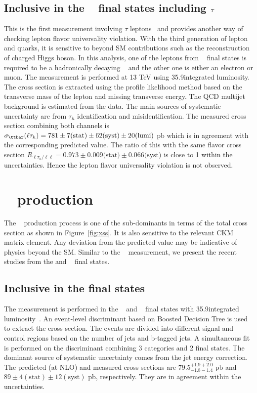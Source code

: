 \subsection{Inclusive in the \dilep~ final states including ${\tau}$}
This is the first measurement involving $\tau$ leptons~\cite{CMS:2019snc} and provides another 
way of checking lepton flavor universality violation. With the third generation of lepton and quarks,
it is sensitive to beyond SM contributions such as the reconstruction of charged Higgs boson. In 
this analysis, one of the leptons from \dilep~ final states is required to be a hadronically 
decaying \PQtau~ and the other one is either an electron or muon. The measurement is performed at 
13 TeV using 35.9\fbinv integrated luminosity. The cross section is extracted using the profile 
likelihood method based on the transverse mass of the lepton and missing transverse energy. The  
QCD multijet background is estimated from the data. The main sources of systematic uncertainty are 
from $\tau_h$ identification and misidentification. The measured cross section combining both 
channels is  
$\sigma_\ttbar(\ell\tau_h) = 781 \pm 7 \text{(stat)} \pm 62 \text{(syst)} \pm 20 \text{(lumi)}$ pb
which is in agreement with the corresponding predicted value. The ratio of this with the same 
flavor cross section 
$R_{\ell\tau_h/\ell\ell} = 0.973 \pm 0.009 \text{(stat)} \pm 0.066 \text{(syst)}$ is close to 1 
within the uncertainties. Hence the lepton flavor universality violation is not observed.

\section{\PQt\PW~ production} 
\label{sec:tW}
The \PQt\PW~ production process is one of the sub-dominants in terms of the total cross section as 
shown in Figure~\ref{fig:xss}. It is also sensitive to the relevant CKM matrix element. 
Any deviation from the predicted value may be indicative of physics beyond the SM. Similar to the 
\ttbar~ measurement, we present the recent studies from the \ljets and \dilep~ final states.

\subsection{Inclusive in the \ljets final states}
The measurement is performed in the \ejets~ and \mujets~ final states with 35.9\fbinv integrated
luminosity~\cite{CMS-PAS-TOP-20-002}. An event-level discriminant based on Boosted Decision Tree 
is used to extract the cross section. The events are divided into different signal and control 
regions based on the number of jets and b-tagged jets. A simultaneous fit is performed on the
discriminant combining 3 categories and 2 final states. The dominant source of systematic 
uncertainty comes from the jet energy correction. The predicted (at NLO) and 
measured cross sections are $79.5^{+1.9+2.0}_{-1.8-1.4}$ pb and 
$89 \pm 4 (\text{stat}) \pm 12 (\text{syst})$ pb, respectively. They are in agreement within the
uncertainties.

